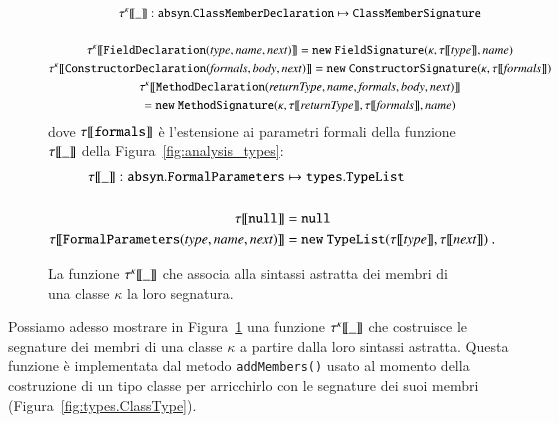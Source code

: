 \begin{figure}
{\small
\begin{multline*}
  \sig{\kappa}{\_}:\mathtt{absyn.ClassMemberDeclaration}\mapsto\mathtt{ClassMemberSignature}\\
  \mbox{}\\
  \sig{\kappa}{\mathtt{FieldDeclaration(\mathit{type},\mathit{name},\mathit{next})}}
    =\mathtt{new\ FieldSignature(\kappa,\st{\mathit{type}},\mathit{name})}\\
  \sig{\kappa}{\mathtt{ConstructorDeclaration(\mathit{formals},\mathit{body},\mathit{next})}}
    =\mathtt{new\ ConstructorSignature(\kappa,\st{\mathit{formals}})}\\
  \sig{\kappa}{\mathtt{MethodDeclaration(\mathit{returnType},\mathit{name},\mathit{formals},\mathit{body},\mathit{next})}}\\
    =\mathtt{new\ MethodSignature(\kappa,\st{\mathit{returnType}},\st{\mathit{formals}},\mathit{name})}
\end{multline*}
%
dove ${\tau[\![{\mathtt{formals}}]\!]}$ \`e l'estensione ai parametri formali della
funzione ${\tau[\![{\_}]\!]}$ della Figura~\ref{fig:analysis_types}:
%
\begin{align*}
  \st{\_}:\mathtt{absyn.FormalParameters}&\mapsto\mathtt{types.TypeList}\\
  \mbox{}\\
  \st{\mathtt{null}}&=\mathtt{null}\\
  \st{\mathtt{FormalParameters(\mathit{type},\mathit{name},\mathit{next})}}&=
    \mathtt{new\ TypeList(\st{\mathit{type}},\st{\mathit{next}})}~.
\end{align*}
}
\caption{La funzione ${\tau^{\kappa}[\![{\_}]\!]}$ che associa alla sintassi astratta dei membri di una classe $\kappa$ la loro segnatura.}\label{fig:signatures_definition}
\end{figure}
%
Possiamo adesso mostrare in Figura~\ref{fig:signatures_definition} una funzione
${\tau^{\kappa}[\![{\_}]\!]}$ che costruisce le segnature dei
membri di una classe $\kappa$ a partire dalla loro sintassi astratta.
Questa funzione \`e implementata dal metodo \texttt{addMembers()}
usato al momento della costruzione di un tipo classe per arricchirlo
con le segnature dei suoi membri (Figura~\ref{fig:types.ClassType}).
%
